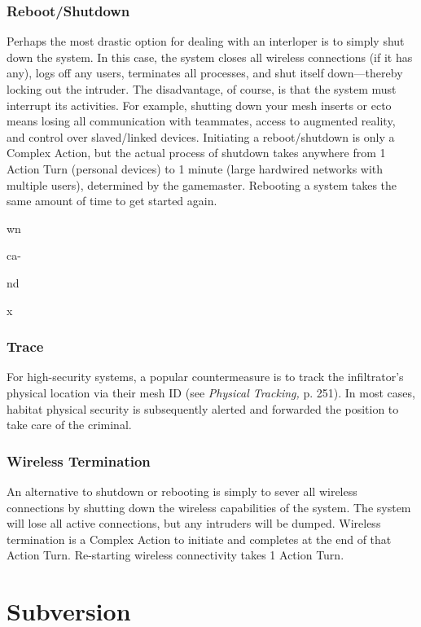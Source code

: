 \subsubsection{Reboot/Shutdown}

Perhaps the most drastic option for dealing with an 
interloper is to simply shut down the system. In this 
case, the system closes all wireless connections (if it 
has any), logs off any users, terminates all processes, 
and shut itself down—thereby locking out the intruder. 
The disadvantage, of course, is that the system must 
interrupt its activities. For example, shutting down 
your mesh inserts or ecto means losing all communication
with teammates, access to augmented reality, and
control over slaved/linked devices.
Initiating a reboot/shutdown is only a Complex 
Action, but the actual process of shutdown takes 
anywhere from 1 Action Turn (personal devices) to 1 
minute (large hardwired networks with multiple users), 
determined by the gamemaster. Rebooting a system 
takes the same amount of time to get started again.

wn

ca-

nd 

x

\subsubsection{Trace}

For high-security systems, a popular countermeasure 
is to track the infiltrator's physical location via their 
mesh ID (see \textit{Physical Tracking,} p. 251). In most cases, 
habitat physical security is subsequently alerted and 
forwarded the position to take care of the criminal.

\subsubsection{Wireless Termination}

An alternative to shutdown or rebooting is simply to 
sever all wireless connections by shutting down the 
wireless capabilities of the system. The system will 
lose all active connections, but any intruders will be 
dumped. Wireless termination is a Complex Action to 
initiate and completes at the end of that Action Turn. 
Re-starting wireless connectivity takes 1 Action Turn.

\section{Subversion}

